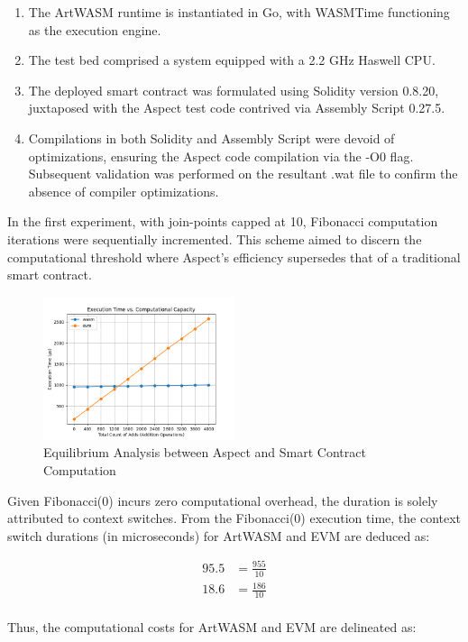 \begin{enumerate}
  \item The ArtWASM runtime is instantiated in Go, with WASMTime functioning as the execution engine.
  \item The test bed comprised a system equipped with a 2.2 GHz Haswell CPU.
  \item The deployed smart contract was formulated using Solidity version 0.8.20, juxtaposed with the Aspect test code contrived via Assembly Script 0.27.5.
  \item Compilations in both Solidity and Assembly Script were devoid of optimizations, ensuring the Aspect code compilation via the -O0 flag. Subsequent validation was performed on the resultant .wat file to confirm the absence of compiler optimizations.
\end{enumerate}

In the first experiment, with join-points capped at 10, Fibonacci computation iterations were sequentially incremented. This scheme aimed to discern the computational threshold where Aspect's efficiency supersedes that of a traditional smart contract.

\begin{figure}[htp]
  \centering
  \includegraphics[width=0.5\textwidth]{sections/tx-latency-et-vs-cc.png}
  \caption{Equilibrium Analysis between Aspect and Smart Contract Computation}
\end{figure}

Given Fibonacci(0) incurs zero computational overhead, the duration is solely attributed to context switches. From the Fibonacci(0) execution time, the context switch durations (in microseconds) for ArtWASM and EVM are deduced as:

\begin{align*}
  95.5 &= \frac{955}{10} \\
  18.6 &= \frac{186}{10} \\
\end{align*}

Thus, the computational costs for ArtWASM and EVM are delineated as:

